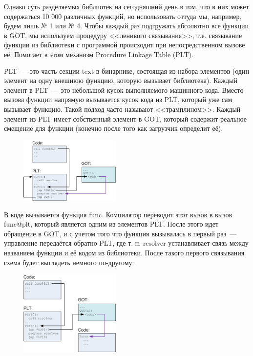 \documentclass[10pt, a5paper]{article}
\begin{document}
Однако суть разделяемых библиотек на сегодняшний день в том, что в них может содержаться 10 000 различных функций, но использовать оттуда мы, например, будем лишь № 1 или № 4. Чтобы каждый раз подгружать абсолютно все функции в GOT, мы используем процедуру <<ленивого связывания>>, т.е. связывание функции из библиотеки с программой происходит при непосредственном вызове её. Помогает в этом механизм Procedure Linkage Table (PLT).

PLT~--- это часть секции text в бинарнике, состоящая из набора элементов (один элемент на одну внешнюю функцию, которую вызывает библиотека). Каждый элемент в PLT~--- это небольшой кусок выполняемого машинного кода. Вместо вызова функции напрямую вызывается кусок кода из PLT, который уже сам вызывает функцию. Такой подход часто называют <<трамплином>>. Каждый элемент из PLT имеет собственный элемент в GOT, который содержит реальное смещение для функции (конечно после того как загрузчик определит её).

\begin{center}
\begin{figure}[h!]
  \centering
  \includegraphics[width=5cm]{12_2018_Zhauniarovich3.png}
  \label{Zhauniarovich3}
\end{figure}
\end{center} 

В коде вызывается функция func. Компилятор переводит этот вызов в вызов func@plt, который является одним из элементов PLT. После этого идет обращение в GOT, и с учетом того что функция вызывалась в первый раз~--- управление передаётся обратно PLT, где т. н. resolver устанавливает связь между названием функции и её кодом из библиотеки. После такого первого связывания схема будет выглядеть немного по-другому:

\begin{center}
\begin{figure}[h!]
  \centering
  \includegraphics[width=5cm]{12_2018_Zhauniarovich4.png}
  \label{Zhauniarovich4}
\end{figure}
\end{center} 
\end{document}
